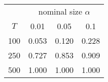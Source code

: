% 
\begin{tabular}{cccc}
  \hline
  & \multicolumn{3}{c}{nominal size $\alpha$} \\
 $T$ & 0.01 & 0.05 & 0.1 \\
 \hline
100 & 0.053 & 0.120 & 0.228 \\ 
  250 & 0.727 & 0.853 & 0.909 \\ 
  500 & 1.000 & 1.000 & 1.000 \\ 
   \hline
\end{tabular}
